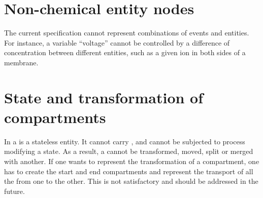 \section{Non-chemical entity nodes}

The current specification cannot represent combinations of events and entities. For instance, a variable ``voltage'' cannot be controlled by a difference of concentration between different entities, such as a given ion in both sides of a membrane. 

\section{State and transformation of compartments}

In \SBGNPDLone a  is a stateless entity. It cannot carry  , and cannot be subjected to process modifying a state. As a result, a  cannot be transformed, moved, split or merged with another. If one wants to represent the transformation of a compartment, one has to create the start and end compartments and represent the transport of all the  from one to the other. This is not satisfactory and should be addressed in the future.
